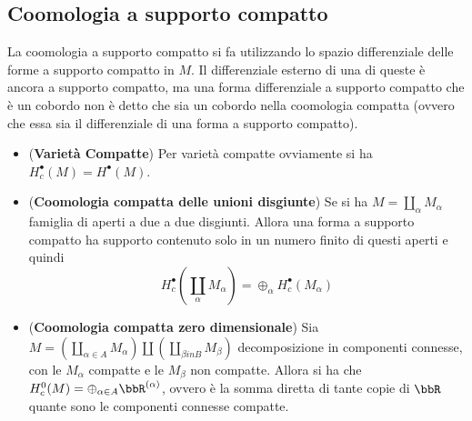 \documentclass[a4paper,NoNotes,GeneralMath]{stdmdoc}
\begin{document}
\subsection{Coomologia a supporto compatto}
La coomologia a supporto compatto si fa utilizzando lo spazio differenziale delle forme a supporto compatto in $M$. Il differenziale esterno di una di queste è ancora a supporto compatto, ma una forma differenziale a supporto compatto che è un cobordo non è detto che sia un cobordo nella coomologia compatta (ovvero che essa sia il differenziale di una forma a supporto compatto).

\begin{itemize}
\item ({\bf Varietà Compatte}) Per varietà compatte ovviamente si ha $H^\bullet_c (M) = H^\bullet(M)$.
\item ({\bf Coomologia compatta delle unioni disgiunte}) Se si ha $M = \coprod_\alpha M_\alpha$ famiglia di aperti a due a due disgiunti. Allora una forma a supporto compatto ha supporto contenuto solo in un numero finito di questi aperti e quindi
  $$ H^\bullet_c (\coprod_\alpha M_\alpha) = \oplus_\alpha H^\bullet_c(M_\alpha) $$
\item ({\bf Coomologia compatta zero dimensionale}) Sia $M = (\coprod_{\alpha \in A} M_\alpha) \coprod (\coprod_{\beta in B} M_\beta)$ decomposizione in componenti connesse, con le $M_\alpha$ compatte e le $M_\beta$ non compatte. Allora si ha che $H^0_c(M) = \oplus_{\alpha \in A} \bbR^{(\alpha)}$, ovvero è la somma diretta di tante copie di $\bbR$ quante sono le componenti connesse compatte.
\end{itemize}
\end{document}
